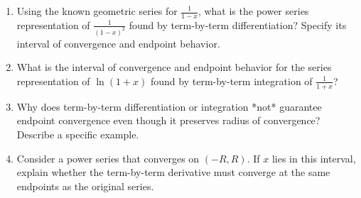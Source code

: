 \begin{enumerate}
\item Using the known geometric series for \(\frac{1}{1-x}\), what is the power series representation of \(\frac{1}{(1-x)^2}\) found by term-by-term differentiation? Specify its interval of convergence and endpoint behavior.

\item What is the interval of convergence and endpoint behavior for the series representation of \(\ln(1+x)\) found by term-by-term integration of \(\frac{1}{1+x}\)?

\item Why does term-by-term differentiation or integration *not* guarantee endpoint convergence even though it preserves radius of convergence? Describe a specific example.

\item Consider a power series that converges on \((-R,R)\). If \(x\) lies in this interval, explain whether the term-by-term derivative must converge at the same endpoints as the original series.

\end{enumerate}
